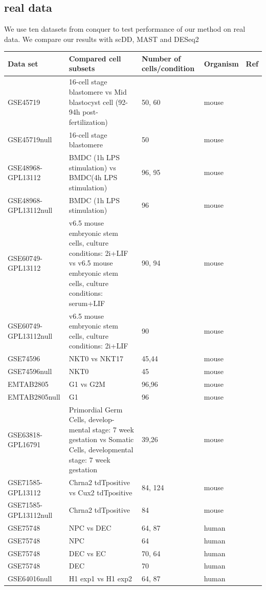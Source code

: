 \documentclass[11pt]{amsart}
\begin{document}
\subsection{real data}
We use ten datasets from conquer\cite{ref:Cq} to test performance of our method on real data. We compare our results with scDD\cite{ref:scDD}, MAST\cite{ref:MAST} and DESeq2\cite{ref:Des}\\
\begin{table}[ht]
\centering
\begin{tabular}{ |p{3cm}|p{6cm}|p{2cm}|p{1cm}|p{1cm}|}
\hline
 Data set & Compared cell subsets & Number of cells/condition & Organism & Ref\\
 \hline
 \hline
 GSE45719 & 16-cell stage blastomere vs Mid blastocyst cell (92-94h post- fertilization) & 50, 60 & mouse & \cite{Deng193}\\
 \hline
 GSE45719null &  16-cell stage blastomere & 50 & mouse &  \cite{Deng193}\\
 \hline
 GSE48968-GPL13112 & BMDC (1h LPS stimulation) vs BMDC(4h LPS stimulation) & 96, 95 & mouse & \cite{Shalek}\\
 \hline
 GSE48968-GPL13112null & BMDC (1h LPS stimulation) & 96 & mouse & \cite{Shalek}\\
 \hline
 GSE60749-GPL13112 & v6.5 mouse embryonic stem cells, culture conditions: 2i+LIF vs v6.5 mouse embryonic stem cells, culture conditions: serum+LIF & 90, 94 & mouse & \cite{Kumar}\\
 \hline
 GSE60749-GPL13112null & v6.5 mouse embryonic stem cells, culture conditions: 2i+LIF & 90 & mouse & \cite{Kumar}\\
 \hline
 GSE74596 & NKT0 vs NKT17 & 45,44 & mouse & \cite{Engel}\\
 \hline
 GSE74596null & NKT0 & 45 & mouse & \cite{Engel}\\
 \hline
 EMTAB2805 & G1 vs G2M & 96,96 & mouse & \cite{EMTAB}\\
 \hline
 EMTAB2805null & G1 & 96 & mouse & \cite{EMTAB}\\
 \hline
 GSE63818-GPL16791 & Primordial Germ Cells, develop- mental stage: 7 week gestation vs Somatic Cells, developmental stage: 7 week gestation & 39,26 & mouse & \cite{Guo}\\
 \hline
 GSE71585-GPL13112 & Chrna2 tdTpositive vs Cux2 tdTpositive & 84, 124 & mouse & \cite{Tasic}\\
 \hline
GSE71585-GPL13112null & Chrna2 tdTpositive & 84 & mouse & \cite{Tasic}\\
\hline
GSE75748 & NPC vs DEC & 64, 87 & human & \cite{chu}\\
\hline
GSE75748 & NPC & 64 & human & \cite{chu}\\
\hline
GSE75748 & DEC vs EC & 70, 64 & human & \cite{chu}\\
\hline
GSE75748 & DEC & 70 & human & \cite{chu}\\
\hline
GSE64016null & H1 exp1 vs H1 exp2 & 64, 87 & human & \cite{oscope}\\
\hline
\end{tabular}
\end{table}
\end{document}
